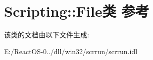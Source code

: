 \hypertarget{class_scripting_1_1_file}{}\section{Scripting\+:\+:File类 参考}
\label{class_scripting_1_1_file}


该类的文档由以下文件生成\+:\begin{DoxyCompactItemize}
\item 
E\+:/\+React\+O\+S-\/0../dll/win32/scrrun/scrrun.\+idl\end{DoxyCompactItemize}
